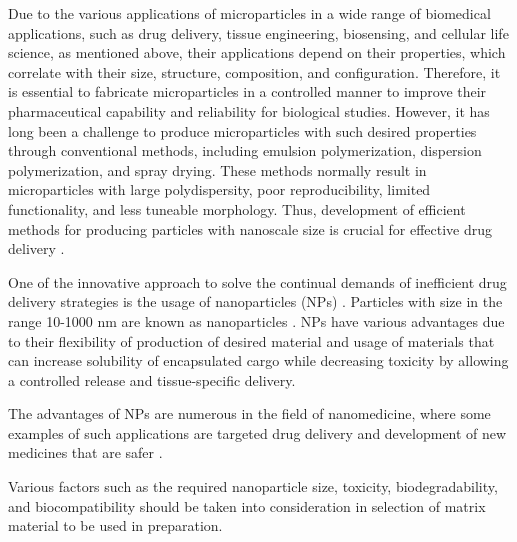 Due to the various applications of microparticles in a wide range of biomedical applications, such as drug delivery, tissue engineering, biosensing, and cellular life science, as mentioned above, their applications depend on their properties, which correlate with their size, structure, composition, and configuration. Therefore, it is essential to fabricate microparticles in a controlled manner to improve their pharmaceutical capability and reliability for biological studies. However, it has long been a challenge to produce microparticles with such desired properties through conventional methods, including emulsion polymerization, dispersion polymerization, and spray drying. These methods normally result in microparticles with large polydispersity, poor reproducibility, limited functionality, and less tuneable morphology. Thus, development of efficient methods for producing particles with nanoscale size is crucial for effective drug delivery \parencite{Liu2014,Patarroyo2020}.

One of the innovative approach to solve the continual demands of inefficient drug delivery strategies is the usage of nanoparticles (NPs) \parencite{Park2013}. Particles with size in the range 10-1000 nm are known as nanoparticles \parencite{strambeanu2014}. 
NPs have various advantages due to their flexibility of production of desired material and usage of materials that can increase solubility of encapsulated cargo while decreasing toxicity by allowing a controlled release and tissue-specific delivery.\parencite{samir2016,scott2009}

The advantages of NPs are numerous in the field of nanomedicine, where some examples of such applications are targeted drug delivery and development of new medicines that are safer \parencite{nitinreview}.

Various factors such as the required nanoparticle size, toxicity, biodegradability, and biocompatibility should be taken into consideration in selection of matrix material to be used in preparation.

